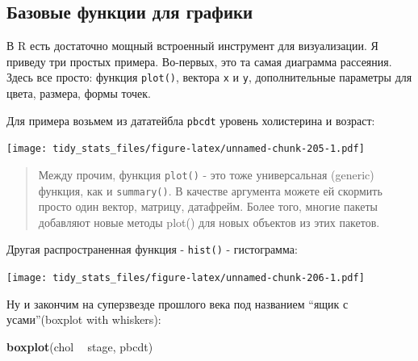 \documentclass[]{book}
\newenvironment{Shaded}{\begin{snugshade}}{\end{snugshade}}
\newcommand{\KeywordTok}[1]{\textcolor[rgb]{0.13,0.29,0.53}{\textbf{#1}}}
\newcommand{\StringTok}[1]{\textcolor[rgb]{0.31,0.60,0.02}{#1}}
\newcommand{\OperatorTok}[1]{\textcolor[rgb]{0.81,0.36,0.00}{\textbf{#1}}}
\newcommand{\NormalTok}[1]{#1}
\begin{document}
\subsection{Базовые функции для графики}\label{base_vis}

В R есть достаточно мощный встроенный инструмент для визуализации. Я
приведу три простых примера. Во-первых, это та самая диаграмма
рассеяния. Здесь все просто: функция \texttt{plot()}, вектора \texttt{x}
и \texttt{у}, дополнительные параметры для цвета, размера, формы точек.

Для примера возьмем из дататейбла \texttt{pbcdt} уровень холистерина и
возраст:

\begin{Shaded}
\end{Shaded}

\texttt{[image: tidy\_stats\_files/figure-latex/unnamed-chunk-205-1.pdf]}

\begin{quote}
Между прочим, функция \texttt{plot()} - это тоже универсальная (generic)
функция, как и \texttt{summary()}. В качестве аргумента можете ей
скормить просто один вектор, матрицу, датафрейм. Более того, многие
пакеты добавляют новые методы plot() для новых объектов из этих пакетов.
\end{quote}

Другая распространенная функция - \texttt{hist()} - гистограмма:

\begin{Shaded}
\end{Shaded}

\texttt{[image: tidy\_stats\_files/figure-latex/unnamed-chunk-206-1.pdf]}

Ну и закончим на суперзвезде прошлого века под названием ``ящик с
усами''(boxplot with whiskers):

\begin{Shaded}
\begin{Highlighting}[]
\KeywordTok{boxplot}\NormalTok{(chol }\OperatorTok{~}\StringTok{ }\NormalTok{stage, pbcdt)}
\end{Highlighting}
\end{Shaded}
\end{document}
